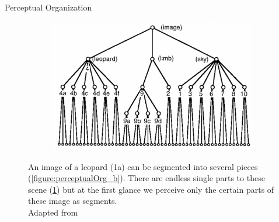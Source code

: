 \documentclass[10pt,xcolor=svgnames]{beamer} %
\begin{document}
\begin{frame}{Perceptual Organization}
\begin{figure}
\begin{subfigure}{0.3\textwidth}
        \end{subfigure}
        \hfill
        \begin{subfigure}{0.32\textwidth}
            \centering
            \includegraphics[width=\textwidth]{pictures/perceptualOrganization_3.png}
            \caption{}
            \label{figure:perceptualOrg_c}
        \end{subfigure}
    \caption{An image of a leopard (1a) can be segmented into several pieces (\ref{figure:perceptualOrg_b}). There are endless single parts to these scene  (\ref{figure:perceptualOrg_c}) but at the first glance we perceive only the certain parts of these image as segments. \\
    {\footnotesize Adapted from \textcite{RN212}}
        }
    \label{fig:perceptual_org}
    \end{figure}
    
\end{frame}
\end{document}
